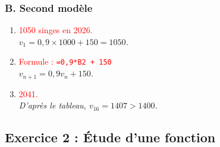 \documentclass[11pt,a4paper]{article}
\newcommand{\reponse}[1]{\textcolor{red}{#1}}
\begin{document}
\subsubsection*{B. Second modèle}
\begin{enumerate}
    \item \reponse{1050 singes en 2026.} \\
    \textit{$v_1 = 0,9 \times 1000 + 150 = 1050$.}

    \item \reponse{Formule : \texttt{=0,9*B2 + 150}} \\
    \textit{$v_{n+1} = 0,9 v_n + 150$.}

    \item \reponse{2041.} \\
    \textit{D'après le tableau, $v_{16} = 1407 > 1400$.}
\end{enumerate}

\subsection*{Exercice 2 : Étude d'une fonction}
\end{document}
